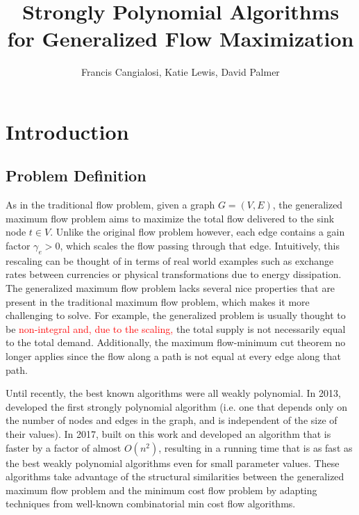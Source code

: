 \documentclass[12pt]{article}
\title{Strongly Polynomial Algorithms for Generalized Flow Maximization}
\author{Francis Cangialosi, Katie Lewis, David Palmer}
\date{}
\theoremstyle{definition}
\newcommand{\rewrite}[1]{\textcolor{red}{#1}}
\begin{document}
\maketitle
\section{Introduction}
	\subsection{Problem Definition} As in the traditional flow problem, given a graph $G = (V,E)$, the generalized maximum flow problem aims to maximize the total flow delivered to the sink node $t \in V$. Unlike the original flow problem however, each edge contains a gain factor $\gamma_e > 0$, which scales the flow passing through that edge. Intuitively, this rescaling can be thought of in terms of real world examples such as exchange rates between currencies or physical transformations due to energy dissipation. The generalized maximum flow problem lacks several nice properties that are present in the traditional maximum flow problem, which makes it more challenging to solve. For example, the generalized problem is usually thought to be \rewrite{non-integral and, due to the scaling,} the total supply is not necessarily equal to the total demand. Additionally, the maximum flow-minimum cut theorem no longer applies since the flow along a path is not equal at every edge along that path.
    
    Until recently, the best known algorithms were all weakly polynomial. In 2013, \cite{Vegh2013} developed the first strongly polynomial algorithm (i.e. one that depends only on the number of nodes and edges in the graph, and is independent of the size of their values). In 2017, \cite{Olver2017} built on this work and developed an algorithm that is faster by a factor of almost $O(n^2)$, resulting in a running time that is as fast as the best weakly polynomial algorithms even for small parameter values. These algorithms take advantage of the structural similarities between the generalized maximum flow problem and the minimum cost flow problem by adapting techniques from well-known combinatorial min cost flow algorithms.
    
\end{document}
